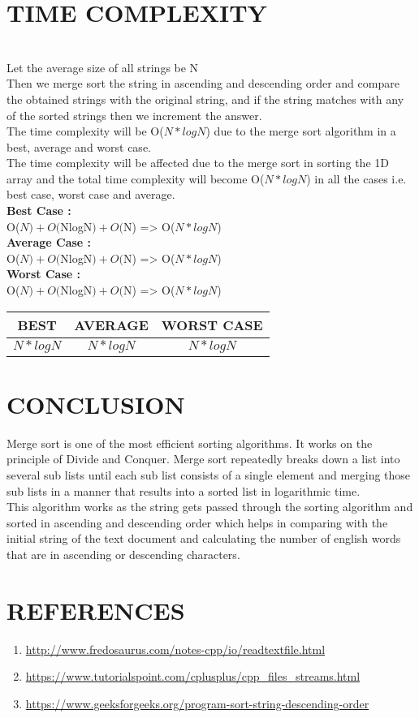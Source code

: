 \documentclass[conference]{IEEEtran}
\begin{document}
\section{TIME COMPLEXITY}\\
Let the average size of all strings be N\\
Then we merge sort the string in ascending and 
descending order and compare the obtained strings 
with the original string, and if the string matches 
with any of the sorted strings then we increment the 
answer.\\ 
The time complexity will be O($N\ast logN$) due to the 
merge sort algorithm in a best, average and worst 
case.\\ 
The time complexity will be affected due to the 
merge sort in sorting the 1D array and the total 
time complexity will become O($N\ast logN$) in 
all the cases i.e. best case, worst case and 
average. 
\\\textbf{Best Case : }
\\O($N) + O($N\ast logN$) + O($N) => O($N\ast logN$)
\\\textbf{Average Case : }
\\O($N) + O($N\ast logN$) + O($N) => O($N\ast logN$)
\\\textbf{Worst Case : }
\\O($N) + O($N\ast logN$) + O($N) => O($N\ast logN$)
\begin{center}
 \begin{tabular}{||c c c||} 
 \hline
  BEST & AVERAGE & WORST CASE  \\ [0.5ex] 
 \hline\hline
 $N\ast logN$ & $N\ast logN$ & $N\ast logN$ \\ 
 \hline
\end{tabular}
\end{center}



\section{CONCLUSION}
Merge sort is one of the most efficient sorting 
algorithms. It works on the principle of Divide and 
Conquer. Merge sort repeatedly breaks down a list 
into several sub lists until each sub list consists of a single element and merging those sub lists in a manner that results into a sorted list in logarithmic time. 
\\This algorithm works as the string gets passed through the sorting algorithm and sorted in ascending and descending order which helps in 
comparing with the initial string of the text 
document and calculating the number of english 
words that are in ascending or descending 
characters. 

\section{REFERENCES}
\begin{enumerate}
    \item \url{http://www.fredosaurus.com/notes-cpp/io/readtextfile.html}
    \item \url{https://www.tutorialspoint.com/cplusplus/cpp_files_streams.html }
    \item \url{https://www.geeksforgeeks.org/program-sort-string-descending-order }
\end{enumerate}
\end{document}
